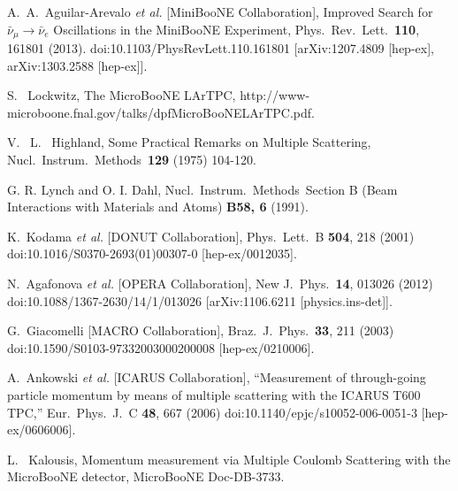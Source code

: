 \begin{thebibliography}{1}

  A.~A.~Aguilar-Arevalo {\it et al.} 
  [MiniBooNE Collaboration],
  Improved Search for $\bar \nu_\mu \rightarrow \bar \nu_e$ Oscillations in the MiniBooNE Experiment,
  Phys.\ Rev.\ Lett.\  {\bf 110}, 161801 (2013).
  doi:10.1103/PhysRevLett.110.161801
  [arXiv:1207.4809 [hep-ex], arXiv:1303.2588 [hep-ex]].

  S. ~Lockwitz, 
  The MicroBooNE LArTPC,
  http://www-microboone.fnal.gov/talks/dpfMicroBooNELArTPC.pdf.

  V. ~L. ~Highland, 
  Some Practical Remarks on Multiple Scattering, 
  Nucl.\ Instrum.\ Methods\ {\bf 129} (1975)
  104-120.

  G. R. Lynch and O. I. Dahl, Nucl.\ Instrum.\ Methods\, 
  Section B (Beam Interactions with Materials and Atoms) {\bf B58, 6} (1991). 


  K.~Kodama {\it et al.} [DONUT Collaboration],
  Phys.\ Lett.\ B {\bf 504}, 218 (2001)
  doi:10.1016/S0370-2693(01)00307-0
  [hep-ex/0012035].

  N.~Agafonova {\it et al.} [OPERA Collaboration],
  New J.\ Phys.\  {\bf 14}, 013026 (2012)
  doi:10.1088/1367-2630/14/1/013026
  [arXiv:1106.6211 [physics.ins-det]].

 
  G.~Giacomelli [MACRO Collaboration],
  Braz.\ J.\ Phys.\  {\bf 33}, 211 (2003)
  doi:10.1590/S0103-97332003000200008
  [hep-ex/0210006].


  A.~Ankowski {\it et al.} [ICARUS Collaboration],
  ``Measurement of through-going particle momentum by means of multiple scattering with the ICARUS T600 TPC,''
  Eur.\ Phys.\ J.\ C {\bf 48}, 667 (2006)
  doi:10.1140/epjc/s10052-006-0051-3
  [hep-ex/0606006].

  L. ~Kalousis, 
  Momentum measurement via Multiple Coulomb
  Scattering with the MicroBooNE detector, 
  MicroBooNE Doc-DB-3733.



\end{thebibliography}
